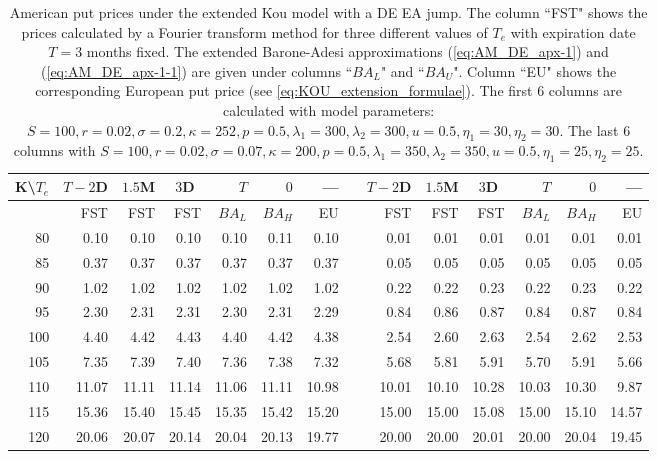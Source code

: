 \documentclass[11pt]{article}
\numberwithin{equation}{section}
\numberwithin{theorem}{section}
\begin{document}
\begin{table}[t!]
  \centering
  \footnotesize
    \begin{tabular}{r|rrrrrrrrrrrrr}
    
    \hline
    K\textbackslash $T_e$ & \multicolumn{1}{c}{$T-2$D} & \multicolumn{1}{c}{$1.5$M} & \multicolumn{1}{c}{$3$D} & $T$ & $0$      & --- & &  \multicolumn{1}{c}{$T-2$D} & \multicolumn{1}{c}{$1.5$M} & \multicolumn{1}{c}{$3$D} & $T$ & $0$      & --- \\
    \hline
     	     & FST   & FST   & FST   & $BA_L$ & $BA_H$ & EU & &FST   & FST   & FST   & $BA_L$ & $BA_H$ & EU \\
    \hline
    80    & 0.10  & 0.10  & 0.10  & 0.10  & 0.11  & 0.10  &       & 0.01  & 0.01  & 0.01  & 0.01  & 0.01  & 0.01 \\
    85    & 0.37  & 0.37  & 0.37  & 0.37  & 0.37  & 0.37  &       & 0.05  & 0.05  & 0.05  & 0.05  & 0.05  & 0.05 \\
    90    & 1.02  & 1.02  & 1.02  & 1.02  & 1.02  & 1.02  &       & 0.22  & 0.22  & 0.23  & 0.22  & 0.23  & 0.22 \\
    95    & 2.30  & 2.31  & 2.31  & 2.30  & 2.31  & 2.29  &       & 0.84  & 0.86  & 0.87  & 0.84  & 0.87  & 0.84 \\
    100   & 4.40  & 4.42  & 4.43  & 4.40  & 4.42  & 4.38  &       & 2.54  & 2.60  & 2.63  & 2.54  & 2.62  & 2.53 \\
    105   & 7.35  & 7.39  & 7.40  & 7.36  & 7.38  & 7.32  &       & 5.68  & 5.81  & 5.91  & 5.70  & 5.91  & 5.66 \\
    110   & 11.07 & 11.11 & 11.14 & 11.06 & 11.11 & 10.98 &       & 10.01 & 10.10 & 10.28 & 10.03 & 10.30 & 9.87 \\
    115   & 15.36 & 15.40 & 15.45 & 15.35 & 15.42 & 15.20 &       & 15.00 & 15.00 & 15.08 & 15.00 & 15.10 & 14.57 \\
    120   & 20.06 & 20.07 & 20.14 & 20.04 & 20.13 & 19.77 &       & 20.00 & 20.00 & 20.01 & 20.00 & 20.04 & 19.45 \\
    \hline
    \end{tabular}
 \caption{\small American put prices under the extended Kou model  with a DE EA jump.   The column ``FST" shows the prices calculated by  a Fourier transform method for three different values of $T_e$ with  expiration date  $T=3$ months  fixed. The extended Barone-Adesi approximations (\ref{eq:AM_DE_apx-1}) and (\ref{eq:AM_DE_apx-1-1})  are  given under columns  ``$BA_L$" and ``$BA_U$". Column ``EU" shows the corresponding  European put price (see \eqref{eq:KOU_extension_formulae}). The first 6 columns are calculated with model parameters: $S=100, r=0.02, \sigma=0.2, \kappa=252, p=0.5, \lambda_1=300, \lambda_2=300, u=0.5, \eta_1=30, \eta_2=30$. The last 6 columns with $S=100, r=0.02, \sigma=0.07, \kappa=200, p=0.5, \lambda_1=350, \lambda_2=350, u=0.5, \eta_1=25, \eta_2=25$.}
  \label{tab:DE_AM_prices}
\end{table}
\end{document}
